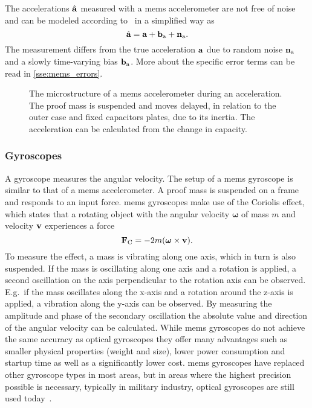 The accelerations $\hat{\vb{a}}$ measured with a \gls{mems} accelerometer are not free of noise and can be modeled according to~\cite{Lefferts1982} in a simplified way as
\begin{equation}
    \hat{\vb{a}} = \vb{a} + \vb{b}_\mathrm{a} + \vb{n}_\mathrm{a}.
\end{equation}
The measurement differs from the true acceleration $\vb{a}$ due to random noise $\vb{n}_\mathrm{a}$ and a slowly time-varying bias $\vb{b}_\mathrm{a}$.
More about the specific error terms can be read in \cref{sse:mems_errors}.
\begin{figure}[htb]
    \centering
    
    \caption[Microstructure of a  accelerometer]{The microstructure of a \acrshort{mems} accelerometer during an acceleration. The proof mass is suspended and moves delayed, in relation to the outer case and fixed capacitors plates, due to its inertia. The acceleration can be calculated from the change in capacity.}
    \label{fig:mems_accelerometer}
\end{figure}

\subsubsection{ Gyroscopes}
A gyroscope measures the angular velocity.
The setup of a \gls{mems} gyroscope is similar to that of a \gls{mems} accelerometer.
A proof mass is suspended on a frame and responds to an input force.
\gls{mems} gyroscopes make use of the Coriolis effect, which states that a rotating object with the angular velocity $\boldsymbol{\omega}$ of mass $m$ and velocity $\vb{v}$ experiences a force
\begin{equation}
    \vb{F}_\mathrm{C}  = -2m(\boldsymbol{\omega}\times \vb{v}).
\end{equation}
To measure the effect, a mass is vibrating along one axis, which in turn is also suspended.
If the mass is oscillating along one axis and a rotation is applied, a second oscillation on the axis perpendicular to the rotation axis can be observed.
E.g.\ if the mass oscillates along the x-axis and a rotation around the z-axis is applied, a vibration along the y-axis can be observed.
By measuring the amplitude and phase of the secondary oscillation the absolute value and direction of the angular velocity can be calculated.
While \gls{mems} gyroscopes do not achieve the same accuracy as optical gyroscopes they offer many advantages such as smaller physical properties (weight and size), lower power consumption and startup time as well as a significantly lower cost.
\gls{mems} gyroscopes have replaced other gyroscope types in most areas, but in areas where the highest precision possible is necessary, typically in military industry, optical gyroscopes are still used today~\cite{Perlmutter2016}.

